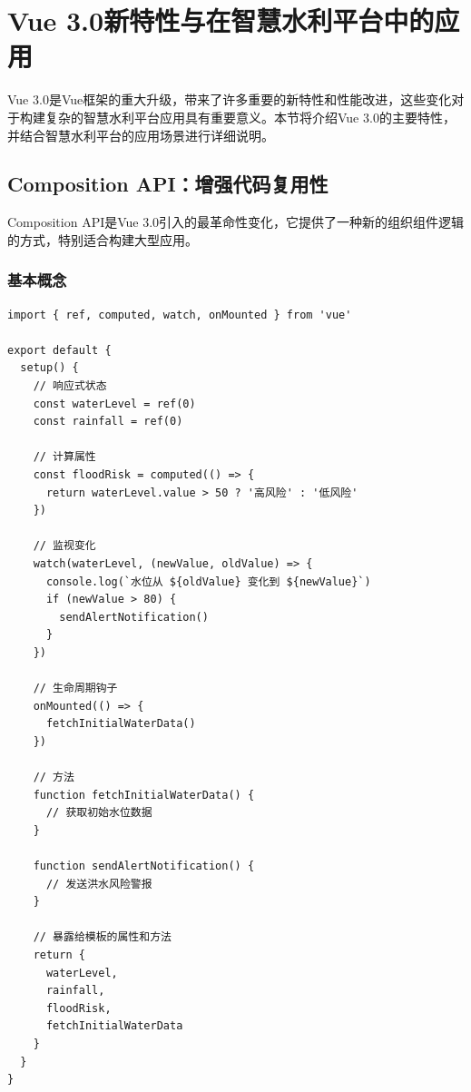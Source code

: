 \section{Vue
3.0新特性与在智慧水利平台中的应用}\label{vue-3.0ux65b0ux7279ux6027ux4e0eux5728ux667aux6167ux6c34ux5229ux5e73ux53f0ux4e2dux7684ux5e94ux7528}

Vue
3.0是Vue框架的重大升级，带来了许多重要的新特性和性能改进，这些变化对于构建复杂的智慧水利平台应用具有重要意义。本节将介绍Vue
3.0的主要特性，并结合智慧水利平台的应用场景进行详细说明。

\subsection{Composition
API：增强代码复用性}\label{composition-apiux589eux5f3aux4ee3ux7801ux590dux7528ux6027}

Composition API是Vue
3.0引入的最革命性变化，它提供了一种新的组织组件逻辑的方式，特别适合构建大型应用。

\subsubsection{基本概念}\label{ux57faux672cux6982ux5ff5}

\begin{lstlisting}
import { ref, computed, watch, onMounted } from 'vue'

export default {
  setup() {
    // 响应式状态
    const waterLevel = ref(0)
    const rainfall = ref(0)
    
    // 计算属性
    const floodRisk = computed(() => {
      return waterLevel.value > 50 ? '高风险' : '低风险'
    })
    
    // 监视变化
    watch(waterLevel, (newValue, oldValue) => {
      console.log(`水位从 ${oldValue} 变化到 ${newValue}`)
      if (newValue > 80) {
        sendAlertNotification()
      }
    })
    
    // 生命周期钩子
    onMounted(() => {
      fetchInitialWaterData()
    })
    
    // 方法
    function fetchInitialWaterData() {
      // 获取初始水位数据
    }
    
    function sendAlertNotification() {
      // 发送洪水风险警报
    }
    
    // 暴露给模板的属性和方法
    return {
      waterLevel,
      rainfall,
      floodRisk,
      fetchInitialWaterData
    }
  }
}
\end{lstlisting}

